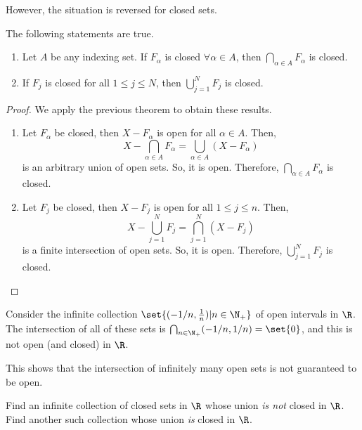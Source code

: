 \documentclass[draft]{penrose}
\begin{document}
However, the situation is reversed for closed sets.
\begin{nthm}
  The following statements are true.
  \begin{enumerate}
  \item Let $A$ be any indexing set. If $F_{\alpha}$ is closed $\forall\alpha\in A$, then $\bigcap_{\alpha\in A} F_{\alpha}$ is closed.
  \item If $F_{j}$ is closed for all $1 \leq j \leq N$, then $\bigcup_{j=1}^{N} F_{j}$ is closed.
  \end{enumerate}
\end{nthm}
\begin{proof}
  We apply the previous theorem to obtain these results.
  \begin{enumerate}
  \item Let $F_{\alpha}$ be closed, then $X-F_{\alpha}$ is open for all $\alpha \in A$. Then,
  \begin{equation*}
    X - \bigcap_{\alpha\in A} F_{\alpha}
    =  \bigcup_{\alpha\in A} \left(X - F_{\alpha}\right)
  \end{equation*}
  is an arbitrary union of open sets. So, it is open. Therefore, $\bigcap_{\alpha\in A} F_{\alpha}$ is closed.

  \item Let $F_{j}$ be closed, then $X-F_{j}$ is open for all $1 \leq j \leq n$. Then,
  \begin{equation*}
    X - \bigcup_{j=1}^{N} F_{j}
    =  \bigcap_{j=1}^{N} \left(X - F_{j}\right)
  \end{equation*}
  is a finite intersection of open sets. So, it is open. Therefore, $\bigcup_{j=1}^{N} F_{j}$ is closed.
  \end{enumerate}
\end{proof}

\begin{negg}
  Consider the infinite collection $\set{(-1/n, \frac{1}{n}) | n \in \N_{+}}$ of open intervals in $\R$. The intersection of all of these sets is $\bigcap_{n \in \N_{+}} (-1/n, 1/n) = \set{0}$, and this is not open (and closed) in $\R$.

  This shows that the intersection of infinitely many open sets is not guaranteed to be open.
\end{negg}

\begin{nex}
  Find an infinite collection of closed sets in $\R$ whose union \emph{is not} closed in $\R$. Find another such collection whose union \emph{is} closed in $\R$.
\end{nex}
\end{document}
